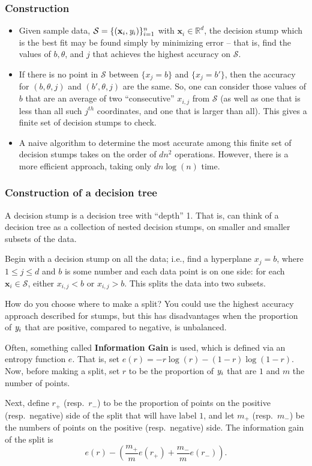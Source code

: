 \documentclass[smaller]{beamer}
\theoremstyle{example}
\newcommand{\x}{\textbf{x}}
\newcommand{\ix}[1]{{\it #1}}
\begin{document}
\begin{frame}
    \frametitle{Construction}
    \begin{itemize}
        \item Given sample data, $\mathcal S = \{(\x_i, \ix y_i)\}_{i=1}^n$ with $\x_i\in\mathbb R^d$, the decision stump which is the best fit may be found simply by minimizing error {--} that is, find the values of $b, \theta$, and $j$ that achieves the highest accuracy on $\mathcal S$. 
        \item If there is no point in $\mathcal S$ between $\{x_{j} = b\}$ and $\{x_{j} = b'\}$, then the accuracy for $(b,\theta,j)$ and $(b',\theta,j)$ are the same. So, one can consider those values of $b$ that are an average of two ``consecutive'' $x_{i,j}$ from $\mathcal S$ (as well as one that is less than all such $j^{th}$ coordinates, and one that is larger than all). This gives a finite set of decision stumps to check.
        \item A naive algorithm to determine the most accurate among this finite set of decision stumps takes on the order of $dn^2$ operations. \newline 
        However, there is a more efficient approach, taking only $dn\log(n)$ time.
    \end{itemize}
\end{frame}

\begin{frame}
    \frametitle{Construction of a decision tree}
A decision stump is a decision tree with ``depth'' 1. That is, can think of a decision tree as a collection of nested decision stumps, on smaller and smaller subsets of the data.

Begin with a decision stump on all the data; i.e., find a hyperplane $ x_j = b$, where $ 1\le j\le d$ and $b$ is some number and each data point is on one side: for each $\x_i \in \mathcal S$, either $x_{i,j} < b$ or $ x_{i,j} > b$. This splits the data into two subsets.

How do you choose where to make a split? You could use the highest accuracy approach described for stumps, but this has disadvantages when the proportion of $\ix y_i$ that are positive, compared to negative, is unbalanced.

Often, something called \textbf{Information Gain} is used, which is defined via an entropy function $e$. That is, set $e(r) = -r\log(r) - (1-r)\log(1-r)$. Now, before making a split, set $r$ to be the proportion of $\ix y_i$ that are $1$ and $m$ the number of points. 

Next, define $r_+$ (resp.\ $r_-$) to be the proportion of points on the positive (resp.\ negative) side of the split that will have label $1$, and let $m_+$ (resp.\ $m_-$) be the numbers of points on the positive (resp.\ negative) side. The information gain of the split is 
    \[e(r) - (\frac{m_+}{m}e(r_+) + \frac{m_-}{m}e(r_-)).\]

\end{frame}
\end{document}
